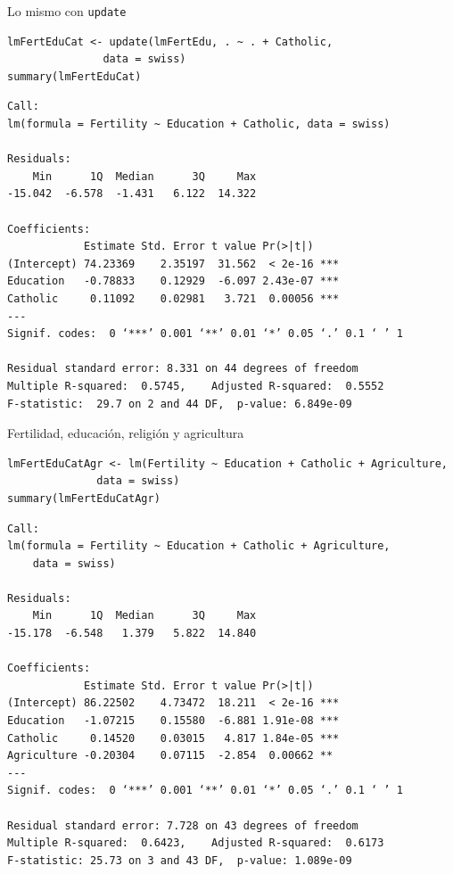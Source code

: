 \documentclass[xcolor={usenames,svgnames,dvipsnames}]{beamer}
\begin{document}
\begin{frame}[fragile,label=sec-3-4]{Lo mismo con \texttt{update}}
 \lstset{language=R,numbers=none}
\begin{lstlisting}
lmFertEduCat <- update(lmFertEdu, . ~ . + Catholic,
		       data = swiss)
summary(lmFertEduCat)
\end{lstlisting}

\begin{verbatim}
Call:
lm(formula = Fertility ~ Education + Catholic, data = swiss)

Residuals:
    Min      1Q  Median      3Q     Max 
-15.042  -6.578  -1.431   6.122  14.322 

Coefficients:
            Estimate Std. Error t value Pr(>|t|)    
(Intercept) 74.23369    2.35197  31.562  < 2e-16 ***
Education   -0.78833    0.12929  -6.097 2.43e-07 ***
Catholic     0.11092    0.02981   3.721  0.00056 ***
---
Signif. codes:  0 ‘***’ 0.001 ‘**’ 0.01 ‘*’ 0.05 ‘.’ 0.1 ‘ ’ 1

Residual standard error: 8.331 on 44 degrees of freedom
Multiple R-squared:  0.5745,	Adjusted R-squared:  0.5552 
F-statistic:  29.7 on 2 and 44 DF,  p-value: 6.849e-09
\end{verbatim}
\end{frame}

\begin{frame}[fragile,label=sec-3-5]{Fertilidad, educación, religión y agricultura}
 \lstset{language=R,numbers=none}
\begin{lstlisting}
lmFertEduCatAgr <- lm(Fertility ~ Education + Catholic + Agriculture,
		      data = swiss)
summary(lmFertEduCatAgr)
\end{lstlisting}

\begin{verbatim}
Call:
lm(formula = Fertility ~ Education + Catholic + Agriculture, 
    data = swiss)

Residuals:
    Min      1Q  Median      3Q     Max 
-15.178  -6.548   1.379   5.822  14.840 

Coefficients:
            Estimate Std. Error t value Pr(>|t|)    
(Intercept) 86.22502    4.73472  18.211  < 2e-16 ***
Education   -1.07215    0.15580  -6.881 1.91e-08 ***
Catholic     0.14520    0.03015   4.817 1.84e-05 ***
Agriculture -0.20304    0.07115  -2.854  0.00662 ** 
---
Signif. codes:  0 ‘***’ 0.001 ‘**’ 0.01 ‘*’ 0.05 ‘.’ 0.1 ‘ ’ 1

Residual standard error: 7.728 on 43 degrees of freedom
Multiple R-squared:  0.6423,	Adjusted R-squared:  0.6173 
F-statistic: 25.73 on 3 and 43 DF,  p-value: 1.089e-09
\end{verbatim}
\end{frame}
\end{document}
